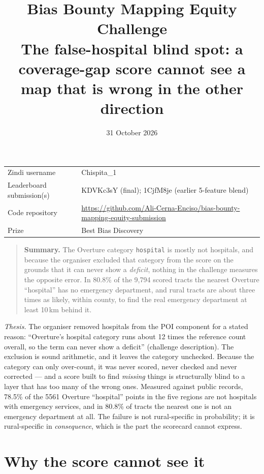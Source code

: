 \documentclass[a4paper]{article}
\title{\vspace{-1.2cm}\textbf{Bias Bounty Mapping Equity Challenge}\\[2pt]
\large The false-hospital blind spot: a coverage-gap score cannot see a map that is wrong in the other direction}
\author{}
\date{31 October 2026}
\newcommand{\zindiuser}{Chispita\_1}
\newcommand{\submissionid}{KDVKc3sY (final); 1CjfM8je (earlier 5-feature blend)}
\newcommand{\coderepo}{https://github.com/Ali-Cerna-Enciso/bias-bounty-mapping-equity-submission}
\begin{document}
\maketitle
\vspace{-1.1cm}

\begin{center}
\small
\begin{tabular}{@{}ll@{}}
\toprule
Zindi username & \zindiuser \\
Leaderboard submission(s) & \submissionid \\
Code repository & \url{\coderepo} \\
Prize & Best Bias Discovery \\
\bottomrule
\end{tabular}
\end{center}

\begin{quote}
\small
\textbf{Summary.} The Overture category \texttt{hospital} is mostly not hospitals,
and because the organiser excluded that category from the score on the grounds that it can never show a
\emph{deficit}, nothing in the challenge measures the opposite error. In 80.8\% of the 9,794 scored
tracts the nearest Overture ``hospital'' has no emergency department, and rural tracts are about three times as
likely, within county, to find the real emergency department at least 10\,km behind it.
\end{quote}






\noindent\emph{Thesis.} The organiser removed hospitals from the POI component for a stated
reason: ``Overture's hospital category runs about 12 times the reference count overall, so the
term can never show a deficit'' (challenge description). The exclusion is sound arithmetic, and it leaves the category unchecked. Because the
category can only over-count, it was never scored, never checked
and never corrected --- and a score built to find \emph{missing} things is structurally blind
to a layer that has too many of the wrong ones. Measured against public records, 78.5\% of
the \num{5561} Overture ``hospital'' points in the five regions are not hospitals with
emergency services, and in 80.8\% of tracts the nearest one is not an emergency department at
all. The failure is not rural-specific in probability; it is rural-specific in
\emph{consequence}, which is the part the scorecard cannot express.

\section{Why the score cannot see it}
\end{document}
